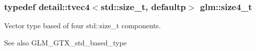 \subsubsection[{\texorpdfstring{size4\+\_\+t}{size4_t}}]{\setlength{\rightskip}{0pt plus 5cm}typedef detail\+::tvec4$<$std\+::size\+\_\+t, defaultp$>$ {\bf glm\+::size4\+\_\+t}}\hypertarget{group__gtx__std__based__type_gaaaf9b6a73135945e356601a01beece30}{}\label{group__gtx__std__based__type_gaaaf9b6a73135945e356601a01beece30}
Vector type based of four std\+::size\+\_\+t components. \begin{DoxySeeAlso}{See also}
G\+L\+M\+\_\+\+G\+T\+X\+\_\+std\+\_\+based\+\_\+type 
\end{DoxySeeAlso}
